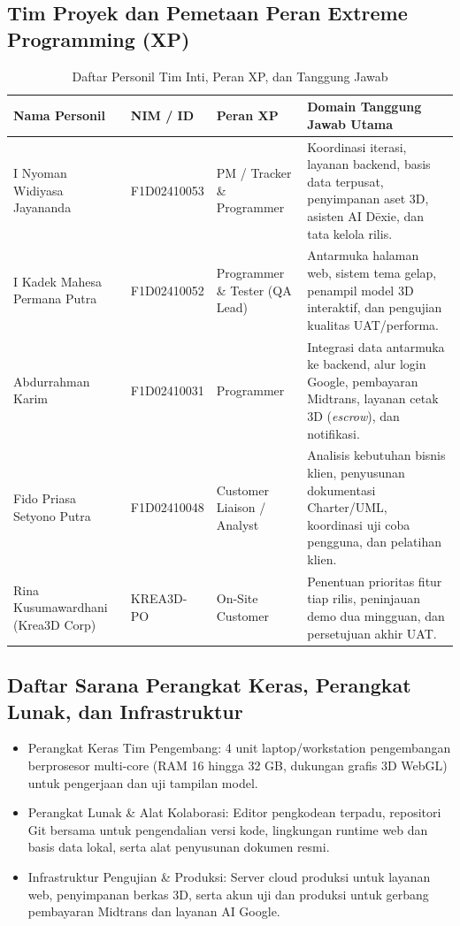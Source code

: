 \documentclass[11pt,a4paper]{article}
\newcommand{\thdr}[1]{\centering\arraybackslash\textbf{#1}}
\begin{document}
\subsection{Tim Proyek dan Pemetaan Peran Extreme Programming (XP)}

\begin{table}[H]
\centering
\caption{Daftar Personil Tim Inti, Peran XP, dan Tanggung Jawab}
\begin{tabularx}{\textwidth}{| L{4.3cm} | C{2.3cm} | L{3.2cm} | Y |}
\hline
{} \thdr{Nama Personil} & \thdr{NIM / ID} & \thdr{Peran XP} & \thdr{Domain Tanggung Jawab Utama} \\
\hline
I Nyoman Widiyasa Jayananda & F1D02410053 & PM / Tracker \& Programmer & Koordinasi iterasi, layanan backend, basis data terpusat, penyimpanan aset 3D, asisten AI D\={e}xie, dan tata kelola rilis. \\
\hline
I Kadek Mahesa Permana Putra & F1D02410052 & Programmer \& Tester (QA Lead) & Antarmuka halaman web, sistem tema gelap, penampil model 3D interaktif, dan pengujian kualitas UAT/performa. \\
\hline
Abdurrahman Karim & F1D02410031 & Programmer & Integrasi data antarmuka ke backend, alur login Google, pembayaran Midtrans, layanan cetak 3D (\textit{escrow}), dan notifikasi. \\
\hline
Fido Priasa Setyono Putra & F1D02410048 & Customer Liaison / Analyst & Analisis kebutuhan bisnis klien, penyusunan dokumentasi Charter/UML, koordinasi uji coba pengguna, dan pelatihan klien. \\
\hline
Rina Kusumawardhani (Krea3D Corp) & KREA3D-PO & On-Site Customer & Penentuan prioritas fitur tiap rilis, peninjauan demo dua mingguan, dan persetujuan akhir UAT. \\
\hline
\end{tabularx}
\end{table}

\subsection{Daftar Sarana Perangkat Keras, Perangkat Lunak, dan Infrastruktur}
\begin{itemize}[leftmargin=1.5em, itemsep=2pt]
    \item Perangkat Keras Tim Pengembang: 4 unit laptop/workstation pengembangan berprosesor multi-core (RAM 16 hingga 32 GB, dukungan grafis 3D WebGL) untuk pengerjaan dan uji tampilan model.
    \item Perangkat Lunak \& Alat Kolaborasi: Editor pengkodean terpadu, repositori Git bersama untuk pengendalian versi kode, lingkungan runtime web dan basis data lokal, serta alat penyusunan dokumen resmi.
    \item Infrastruktur Pengujian \& Produksi: Server cloud produksi untuk layanan web, penyimpanan berkas 3D, serta akun uji dan produksi untuk gerbang pembayaran Midtrans dan layanan AI Google.
\end{itemize}
\end{document}
